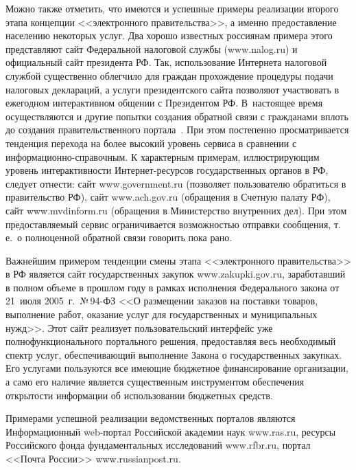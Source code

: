 \begin{multicols}{2}
Можно также отметить, что имеются и успешные примеры реализации второго этапа
концепции <<электронного правительства>>, а именно предо\-став\-ле\-ние населению
некоторых услуг. Два хорошо известных россиянам примера этого представляют сайт
Федеральной налоговой службы ({\sf www.nalog.ru}) и официальный сайт президента РФ.
Так, использование Интернета налоговой службой существенно облегчило для граждан
прохождение процедуры подачи налоговых деклараций, а услуги президентского сайта
позволяют участвовать в ежегодном интерактивном общении с Президентом РФ. 
В~настоящее время осуществляются и другие попытки создания обратной связи с
гражданами вплоть до создания правительственного портала~\cite{17bos}. При этом
постепенно просматривается тенденция перехода на более высокий уровень сервиса в
сравнении с информационно-справочным. К характерным примерам, иллюстрирующим
уровень интерактивности Интернет-ресурсов государственных органов в РФ, следует
отнести: сайт {\sf www.government.ru} (позволяет пользователю обратиться в
правительство РФ), сайт {\sf www.ach.gov.ru} (обращения в Счетную палату РФ), сайт {\sf
www.mvdinform.ru} (обращения в Министерство внутренних дел). При этом
предоставляемый сервис ограничивается возможностью отправки сообщения, т.\,е.\ о
полноценной обратной связи говорить пока рано.

Важнейшим примером тенденции смены этапа <<электронного правительства>> в РФ
является сайт государственных закупок {\sf www.zakupki.gov.ru}, заработавший в полном
объеме в прошлом году в рамках исполнения Федерального закона от 21~июля 2005~г.\
№\,94-ФЗ <<О размещении заказов на поставки товаров, выполнение работ, оказание
услуг для государственных и муниципальных нужд>>. Этот сайт реализует
пользовательский интерфейс уже полнофункционального портального решения,
предоставляя весь необходимый спектр услуг, обеспечивающий выполнение Закона о
государственных закупках. Его услугами пользуются все имеющие бюджетное
финансирование организации, а само его наличие является существенным инструментом
обеспечения открытости информации об использовании бюджетных средств.

Примерами успешной реализации ведомственных порталов являются Информационный
web-пор\-тал Российской академии наук {\sf www.ras.ru}, ресур\-сы Российского фонда
фундаментальных
исследований {\sf www.rfbr.ru}, портал <<Почта России>> {\sf
www.russianpost.ru}.


\end{multicols}
